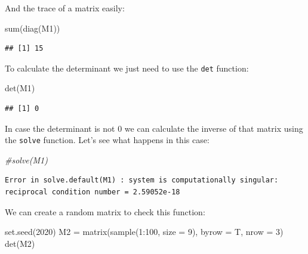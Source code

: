 \documentclass[
]{book}
\newenvironment{Shaded}{\begin{snugshade}}{\end{snugshade}}
\newcommand{\AttributeTok}[1]{\textcolor[rgb]{0.77,0.63,0.00}{#1}}
\newcommand{\CommentTok}[1]{\textcolor[rgb]{0.56,0.35,0.01}{\textit{#1}}}
\newcommand{\DecValTok}[1]{\textcolor[rgb]{0.00,0.00,0.81}{#1}}
\newcommand{\FunctionTok}[1]{\textcolor[rgb]{0.00,0.00,0.00}{#1}}
\newcommand{\NormalTok}[1]{#1}
\newcommand{\OtherTok}[1]{\textcolor[rgb]{0.56,0.35,0.01}{#1}}
\newcommand{\SpecialCharTok}[1]{\textcolor[rgb]{0.00,0.00,0.00}{#1}}
\theoremstyle{definition}
\theoremstyle{definition}
\theoremstyle{definition}
\theoremstyle{definition}
\theoremstyle{remark}
\begin{document}
And the trace of a matrix easily:

\begin{Shaded}
\begin{Highlighting}[]
\FunctionTok{sum}\NormalTok{(}\FunctionTok{diag}\NormalTok{(M1))}
\end{Highlighting}
\end{Shaded}

\begin{verbatim}
## [1] 15
\end{verbatim}

To calculate the determinant we just need to use the \texttt{det} function:

\begin{Shaded}
\begin{Highlighting}[]
\FunctionTok{det}\NormalTok{(M1)}
\end{Highlighting}
\end{Shaded}

\begin{verbatim}
## [1] 0
\end{verbatim}

In case the determinant is not 0 we can calculate the inverse of that matrix using the \texttt{solve} function. Let's see what happens in this case:

\begin{Shaded}
\begin{Highlighting}[]
\CommentTok{\#solve(M1)}
\end{Highlighting}
\end{Shaded}

\begin{verbatim}
Error in solve.default(M1) : system is computationally singular: reciprocal condition number = 2.59052e-18
\end{verbatim}

We can create a random matrix to check this function:

\begin{Shaded}
\begin{Highlighting}[]
\FunctionTok{set.seed}\NormalTok{(}\DecValTok{2020}\NormalTok{)}
\NormalTok{M2 }\OtherTok{=} \FunctionTok{matrix}\NormalTok{(}\FunctionTok{sample}\NormalTok{(}\DecValTok{1}\SpecialCharTok{:}\DecValTok{100}\NormalTok{, }\AttributeTok{size =} \DecValTok{9}\NormalTok{), }\AttributeTok{byrow =}\NormalTok{ T, }\AttributeTok{nrow =} \DecValTok{3}\NormalTok{)}
\FunctionTok{det}\NormalTok{(M2)}
\end{Highlighting}
\end{Shaded}
\end{document}

